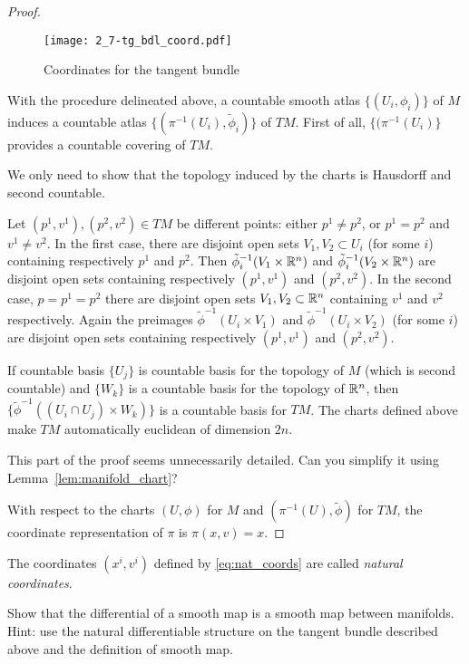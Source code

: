 \begin{proof}
  \begin{figure*}[htp]
    \texttt{[image: 2\_7-tg\_bdl\_coord.pdf]}
    \caption{Coordinates for the tangent bundle}
  \end{figure*}
  
  With the procedure delineated above, a countable smooth atlas $\{(U_i, \phi_i)\}$ of $M$ induces a countable atlas $\{(\pi^{-1}(U_i), \tilde\phi_i)\}$ of $TM$.
  First of all, $\{(\pi^{-1}(U_i)\}$ provides a countable covering of $TM$.
  
  We only need to show that the topology induced by the charts is Hausdorff and second countable.
  
  Let $(p^1, v^1), (p^2, v^2) \in TM$ be different points: either $p^1\neq p^2$, or $p^1 = p^2$ and $v^1 \neq v^2$.
  In the first case, there are disjoint open sets $V_1, V_2 \subset U_i$ (for some $i$) containing respectively $p^1$ and $p^2$.
  Then $\tilde\phi_i^{-1}(V_1\times\mathbb{R}^n)$ and $\tilde\phi_i^{-1}(V_2\times\mathbb{R}^n)$ are disjoint open sets containing respectively $(p^1, v^1)$ and $(p^2, v^2)$.
  In the second case, $p=p^1=p^2$ there are disjoint open sets $V_1,V_2\subset \mathbb{R}^n$ containing $v^1$ and $v^2$ respectively.
  Again the preimages $\tilde\phi^{-1}(U_i\times V_1)$ and $\tilde\phi^{-1}(U_i\times V_2)$ (for some $i$) are disjoint open sets containing respectively $(p^1, v^1)$ and $(p^2, v^2)$.

  If countable basis $\{U_j\}$ is countable basis for the topology of $M$ (which is second countable) and $\{W_k\}$ is a countable basis for the topology of $\mathbb{R}^n$, then $\{\tilde\phi^{-1}((U_i\cap U_j)\times W_k)\}$ is a countable basis for $TM$.
  The charts defined above make $TM$ automatically euclidean of dimension $2n$.

  \begin{exercise}
    This part of the proof seems unnecessarily detailed.
    Can you simplify it using Lemma~\ref{lem:manifold_chart}?
  \end{exercise}

   With respect to the charts $(U,\phi)$ for $M$ and $(\pi^{-1}(U), \tilde\phi)$ for $TM$, the coordinate representation of $\pi$ is $\pi(x,v) = x$.
\end{proof}

The coordinates $(x^i, v^i)$ defined by \eqref{eq:nat_coords} are called \emph{natural coordinates}.

\begin{exercise}
  Show that the differential of a smooth map is a smooth map between manifolds. Hint: use the natural differentiable structure on the tangent bundle described above and the definition of smooth map.
\end{exercise}

